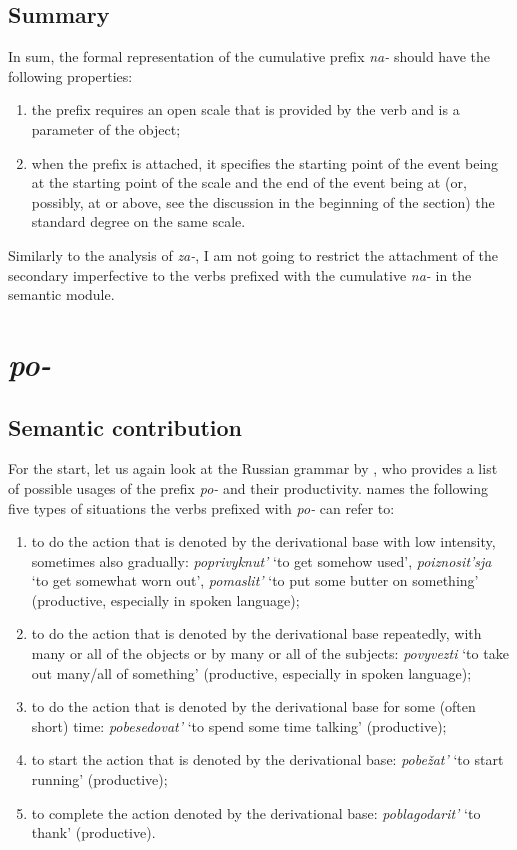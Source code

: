 \subsection{Summary} 
In sum, the formal representation of the cumulative prefix \textit{na-} should have the following properties: 
\begin{enumerate}
\item the prefix requires an open scale that is provided by the verb and is a parameter of the object;
\item when the prefix is attached, it specifies the starting point of the event being at the starting point of the scale and the end of the event being at (or, possibly, at or above, see the discussion in the beginning of the section) the standard degree on the same scale.
\end{enumerate}

Similarly to the analysis of \textit{za-}, I am not going to restrict the attachment of the secondary imperfective to the verbs prefixed with the cumulative \textit{na-} in the semantic module.

\section{\textit{po-}}\label{subsection:semantics:po}
\subsection{Semantic contribution} For the start, let us again look at the Russian grammar by \citet{Shvedova:82}, who provides a list of possible usages of the prefix \textit{po-} and their productivity. \citet[364--365]{Shvedova:82} names the following five types of situations the verbs prefixed with \textit{po-} can refer to:
\begin{enumerate}
\item to do the action that is denoted by the derivational base with low intensity, sometimes also gradually: \textit{poprivyknut'} `to get somehow used', \textit{po\-izno\-sit'sja} `to get somewhat worn out', \textit{pomaslit'} `to put some butter on something'  (productive, especially in spoken language);
\item to do the action that is denoted by the derivational base repeatedly, with many or all of the objects or by many or all of the subjects: \textit{povyvezti} `to take out many/all of something' (productive, especially in spoken language);
\item to do the action that is denoted by the derivational base for some (often short) time: \textit{pobesedovat'} `to spend some time talking' (productive);
\item to start the action that is denoted by the derivational base: \textit{pobe\v{z}at'} `to start running' (productive);
\item to complete the action denoted by the derivational base: \textit{poblagodarit'} `to thank' (productive).
\end{enumerate}

